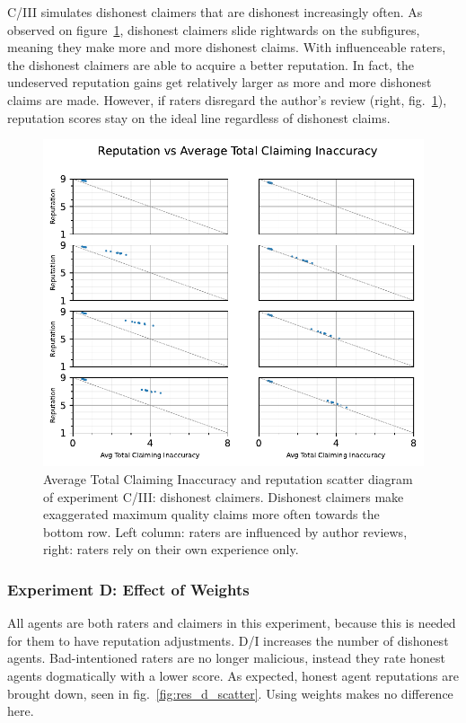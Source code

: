\documentclass[%
    ]{\PathToTumTemplate/thesis/tum_thesis}
\begin{document}
C/III simulates dishonest claimers that are dishonest increasingly often.
As observed on figure~\ref{fig:res_c3_scatter}, dishonest claimers slide rightwards on the subfigures, meaning they make more and more dishonest claims.
With influenceable raters, the dishonest claimers are able to acquire a better reputation.
In fact, the undeserved reputation gains get relatively larger as more and more dishonest claims are made.
However, if raters disregard the author's review (right, fig.~\ref{fig:res_c3_scatter}), reputation scores stay on the ideal line regardless of dishonest claims.

\begin{figure}[tbp]
  \begin{center}
        \includegraphics[width=0.75\linewidth]	{../results/c3/AvgTotClaimInaccuracyAndReputationScatter_joined.pdf}
    \caption{
    Average Total Claiming Inaccuracy and reputation scatter diagram of experiment C/III: dishonest claimers.
    Dishonest claimers make exaggerated maximum quality claims more often towards the bottom row.
    Left column: raters are influenced by author reviews, right: raters rely on their own experience only.
    }
    \label{fig:res_c3_scatter}
  \end{center}
\end{figure}

\subsubsection{Experiment D: Effect of Weights}

All agents are both raters and claimers in this experiment, because this is needed for them to have reputation adjustments.
D/I increases the number of dishonest agents.
Bad-intentioned raters are no longer malicious, instead they rate honest agents dogmatically with a lower score.
As expected, honest agent reputations are brought down, seen in fig.~\ref{fig:res_d_scatter}.
Using weights makes no difference here.
\end{document}
